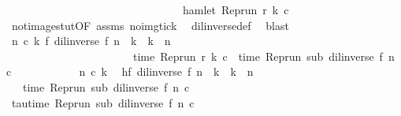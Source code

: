 \begin{isabellebody}
\ \ \ \ \ \ \ \ \ \ \ \ \ \ \ \ \ \ \ \ \ \ \ \ \ \ \ \ \ \ {\isasymlongrightarrow}\ {\isasymnot}\ hamlet\ {\isacharparenleft}{\isacharparenleft}Rep{\isacharunderscore}run\ r{\isacharparenright}\ k\ c{\isacharparenright}{\isacartoucheclose}\isanewline
\ \ \ \ \isamarkupfalse%
\ not{\isacharunderscore}image{\isacharunderscore}stut{\isacharbrackleft}OF\ assms{\isacharbrackright}\ no{\isacharunderscore}img{\isacharunderscore}tick\ \isamarkupfalse%
\ dil{\isacharunderscore}inverse{\isacharunderscore}def\ \isamarkupfalse%
\ blast\isanewline
\isanewline
\ \ \isamarkupfalse%
\ {}{\isacharcolon}{\isacartoucheopen}{\isacharparenleft}{\isasymforall}n\ c\ k{\isachardot}\ f\ {\isacharparenleft}{\isacharparenleft}dil{\isacharunderscore}inverse\ f{\isacharparenright}\ n{\isacharparenright}\ {\isasymle}\ k\ {\isasymand}\ k\ {\isasymle}\ n\isanewline
\ \ \ \ \ \ \ \ \ \ \ \ \ \ \ \ \ \ \ \ \ \ {\isasymlongrightarrow}\ time\ {\isacharparenleft}{\isacharparenleft}Rep{\isacharunderscore}run\ r{\isacharparenright}\ k\ c{\isacharparenright}\ {\isacharequal}\ time\ {\isacharparenleft}{\isacharparenleft}Rep{\isacharunderscore}run\ sub{\isacharparenright}\ {\isacharparenleft}{\isacharparenleft}dil{\isacharunderscore}inverse\ f{\isacharparenright}\ n{\isacharparenright}\ c{\isacharparenright}{\isacharparenright}{\isacartoucheclose}\isanewline
\ \ \isamarkupfalse%
\ {\isacharminus}\isanewline
\ \ \ \ \isacommand{{\isacharbraceleft}}\isamarkupfalse%
\ \isamarkupfalse%
\ n\ c\ k\ \isamarkupfalse%
\ h{\isacharcolon}{\isacartoucheopen}f\ {\isacharparenleft}{\isacharparenleft}dil{\isacharunderscore}inverse\ f{\isacharparenright}\ n{\isacharparenright}\ {\isasymle}\ k\ {\isasymand}\ k\ {\isasymle}\ n{\isacartoucheclose}\isanewline
\ \ \ \ \ \ \isamarkupfalse%
\ {\isacharquery}{\isasymtau}\ {\isacharequal}\ {\isacartoucheopen}time\ {\isacharparenleft}Rep{\isacharunderscore}run\ sub\ {\isacharparenleft}{\isacharparenleft}dil{\isacharunderscore}inverse\ f{\isacharparenright}\ n{\isacharparenright}\ c{\isacharparenright}{\isacartoucheclose}\isanewline
\ \ \ \ \ \ \isamarkupfalse%
\ tau{\isacharcolon}{\isacartoucheopen}time\ {\isacharparenleft}Rep{\isacharunderscore}run\ sub\ {\isacharparenleft}{\isacharparenleft}dil{\isacharunderscore}inverse\ f{\isacharparenright}\ n{\isacharparenright}\ c{\isacharparenright}\ {\isacharequal}\ {\isacharquery}{\isasymtau}{\isacartoucheclose}\ \isacommand{{\isachardot}{\isachardot}}\isamarkupfalse%

\end{isabellebody}
